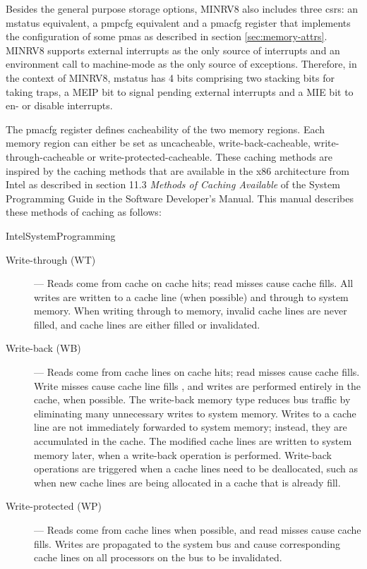 Besides the general purpose storage options, MINRV8 also includes three \glspl{csr}: an \gls{mstatus} equivalent, a \gls{pmpcfg} equivalent and a \gls{pmacfg} register that implements the configuration of some \glspl{pma} as described in section \ref{sec:memory-attrs}.
MINRV8 supports external interrupts as the only source of interrupts and an environment call to machine-mode as the only source of exceptions.
Therefore, in the context of MINRV8, \gls{mstatus} has 4 bits comprising two stacking bits for taking traps, a MEIP bit to signal pending external interrupts and a MIE bit to en- or disable interrupts.

The \gls{pmacfg} register defines cacheability of the two memory regions.
Each memory region can either be set as uncacheable, write-back-cacheable, write-through-cacheable or write-protected-cacheable.
These caching methods are inspired by the caching methods that are available in the x86 architecture from Intel as described in section 11.3 \textit{Methods of Caching Available} of the System Programming Guide in the Software Developer's Manual.
This manual describes these methods of caching as follows:
\begin{displaycquote}[p.11-7]{IntelSystemProgramming}
    \begin{description}
        \item[Write-through (WT)] --- \textelp{} Reads come from cache on cache hits; read misses cause cache fills. \textelp{}
        All writes are written to a cache line (when possible) and through to system memory.
        When writing through to memory, invalid cache lines are never filled, and cache lines are either filled or invalidated. \textelp{}
        \item[Write-back (WB)] --- \textelp{} Reads come from cache lines on cache hits; read misses cause cache fills. \textelp{}
        Write misses cause cache line fills \textelp{}, and writes are performed entirely in the cache, when possible. \textelp{}
        The write-back memory type reduces bus traffic by eliminating many unnecessary writes to system memory.
        Writes to a cache line are not immediately forwarded to system memory; instead, they are accumulated in the cache.
        The modified cache lines are written to system memory later, when a write-back operation is performed.
        Write-back operations are triggered when a cache lines need to be deallocated, such as when new cache lines are being allocated in a cache that is already fill. \textelp{}
        \item[Write-protected (WP)] --- Reads come from cache lines when possible, and read misses cause cache fills.
        Writes are propagated to the system bus and cause corresponding cache lines on all processors on the bus to be invalidated.
        \textelp{}
    \end{description}
\end{displaycquote}

